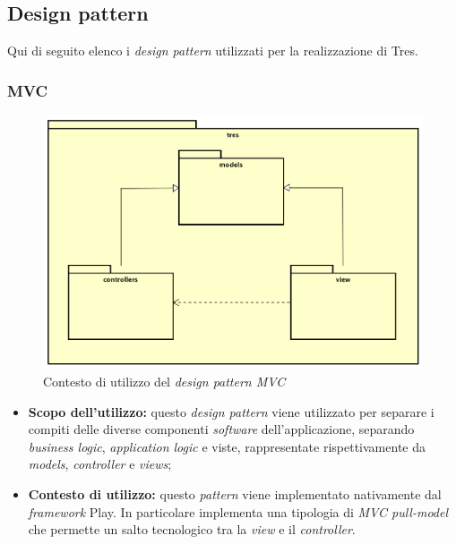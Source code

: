 \subsection{Design pattern}
Qui di seguito elenco i \emph{design pattern} utilizzati per la realizzazione di Tres.
\subsubsection{MVC}
\begin{figure}[h]
\centering
\includegraphics[scale=0.20]{immagini/mvc}
\caption{Contesto di utilizzo del \emph{design pattern MVC}}
\label{fig:pattern-mvc}
\end{figure}
\begin{itemize}
\item\textbf{Scopo dell'utilizzo:} questo \emph{design pattern} viene utilizzato per separare i compiti delle diverse componenti \emph{software} dell'applicazione, separando \emph{business logic}, \emph{application logic} e viste, rappresentate rispettivamente da \emph{models}, \emph{controller} e \emph{views};
\item \textbf{Contesto di utilizzo:} questo \emph{pattern} viene implementato nativamente dal \emph{framework} Play. In particolare implementa una tipologia di \emph{MVC pull-model} che permette un salto tecnologico tra la \emph{view} e il \emph{controller}.
\end{itemize}
